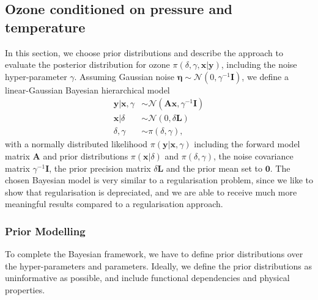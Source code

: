 \subsection{Ozone conditioned on pressure and temperature}
\label{subsec:OzoneSetup}
In this section, we choose prior distributions and describe the approach to evaluate the posterior distribution for ozone $\pi(\delta, \gamma, \bm{x}|\bm{y})$, including the noise hyper-parameter $\gamma$.
Assuming Gaussian noise $\bm{\eta} \sim \mathcal{N}(0, \gamma^{-1} \bm{I})$, we define a linear-Gaussian Bayesian hierarchical model~\cite{fox2016fast}
\begin{subequations}
	\begin{align}
		\bm{y} |  \bm{x}, \gamma &\sim \mathcal{N}(\bm{A} \bm{x}, \gamma^{-1} \bm{I}) \label{eq:likelihood} \\
		\bm{x} |  \delta &\sim \mathcal{N}(0, \delta \bm{L}) \label{eq:xPrior} \\
		\delta, \gamma &\sim \pi(\delta, \gamma) \label{eq:gammaPrior},
	\end{align}
	\label{eq:BayMode}
\end{subequations}
with a normally distributed likelihood $\pi(\bm{y} |  \bm{x}, \gamma)$ including the forward model matrix $\bm{A}$ and prior distributions $\pi(\bm{x} |  \delta)$ and $\pi(\delta, \gamma)$, the noise covariance matrix $\gamma^{-1} \bm{I}$, the prior precision matrix $\delta \bm{L}$ and the prior mean set to $\bm{0}$.
The chosen Bayesian model is very similar to a regularisation problem, since we like to show that regularisation is depreciated, and we are able to receive much more meaningful results compared to a regularisation approach.

\subsubsection{Prior Modelling}
To complete the Bayesian framework, we have to define prior distributions over the hyper-parameters and parameters.
Ideally, we define the prior distributions as uninformative as possible, and include functional dependencies and physical properties.

